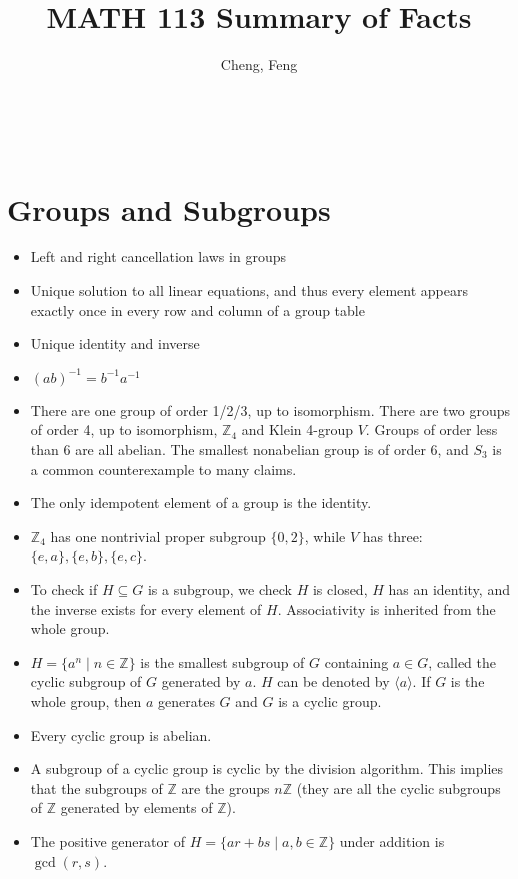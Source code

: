 \documentclass{article}
\title{MATH 113 Summary of Facts}
\author{Cheng, Feng}
\newcommand{\Z}{\mathbb{Z}}
\begin{document}
\begin{center}
    {\Large \@title} \vspace{0.5em}
    \\ \@author
    \vspace{-0.5em}
\end{center}
\makeatother

\section{Groups and Subgroups}
\begin{itemize}
    \item Left and right cancellation laws in groups
    \item Unique solution to all linear equations, and thus every element appears exactly once in every row and column of a group table
    \item Unique identity and inverse
    \item $(ab)^{-1}= b^{-1}a^{-1}$
    \item There are one group of order 1/2/3, up to isomorphism. There are two groups of order 4, up to isomorphism, $\Z_4$ and Klein 4-group $V$. Groups of order less than 6 are all abelian. The smallest nonabelian group is of order 6, and $S_3$ is a common  counterexample to many claims.
    \item The only idempotent element of a group is the identity.
    \item $\Z_4$ has one nontrivial proper subgroup $\{0,2\}$, while $V$ has three: $\{e,a\}, \{e,b\},\{e,c\}$.
    \item To check if $H \subseteq G$ is a subgroup, we check $H$ is closed, $H$ has an identity, and the inverse exists for every element of $H$. Associativity is inherited from the whole group.
    \item $H = \{a^n \mid n \in \Z\}$ is the smallest subgroup of $G$ containing $a \in G$, called the cyclic subgroup of $G$ generated by $a$. $H$ can be denoted by $\langle a \rangle$. If $G$ is the whole group, then $a$ generates $G$ and $G$ is a cyclic group.
    \item Every cyclic group is abelian.
    \item A subgroup of a cyclic group is cyclic by the division algorithm. This implies that the subgroups of $\Z$ are the groups $n\Z$ (they are all the cyclic subgroups of $\Z$ generated by elements of $\Z$).
    \item The positive generator of $H = \{ar+bs \mid a,b \in \Z\}$ under addition is $\gcd(r,s)$.

\end{itemize}
\end{document}
